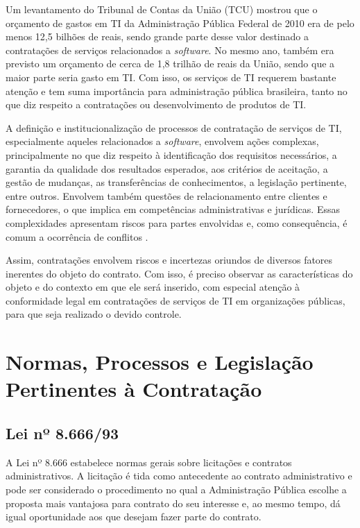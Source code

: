 Um levantamento do Tribunal de Contas da União (TCU) mostrou que o orçamento de gastos em TI da Administração Pública Federal de 2010 era de pelo menos 12,5 bilhões de reais, sendo grande parte desse valor destinado a contratações de serviços relacionados a \textit{software}. No mesmo ano, também era previsto um orçamento de cerca de 1,8 trilhão de reais da União, sendo que a maior parte seria gasto em TI. Com isso, os serviços de TI requerem bastante atenção e tem suma importância para administração pública brasileira, tanto no que diz respeito a contratações ou desenvolvimento de produtos de TI.

A definição e institucionalização de processos de contratação de serviços de TI, especialmente aqueles relacionados a \textit{software}, envolvem ações complexas, principalmente no que diz respeito à identificação dos requisitos necessários, a garantia da qualidade dos resultados esperados, aos critérios de aceitação, a gestão de mudanças, as transferências de conhecimentos, a legislação pertinente, entre outros. Envolvem também questões de relacionamento entre clientes e fornecedores, o que implica em competências administrativas e jurídicas. Essas complexidades apresentam riscos para partes envolvidas e, como consequência, é comum a ocorrência de conflitos \cite{cruz2011}.

Assim, contratações envolvem riscos e incertezas oriundos de diversos fatores inerentes do objeto do contrato. Com isso, é preciso observar as características do objeto e do contexto em que ele será inserido, com especial atenção à conformidade legal em contratações de serviços de TI em organizações públicas, para que seja realizado o devido controle.


\section[Normas, Processos e Legislação Pertinentes à Contratação]{Normas, Processos e Legislação Pertinentes à Contratação}

\subsection[Lei nº 8.666/93]{Lei nº 8.666/93}

A Lei nº 8.666 \cite{Lei8666:1993} estabelece normas gerais sobre licitações e contratos administrativos. A licitação é tida como antecedente ao contrato administrativo e pode ser considerado o procedimento no qual a Administração Pública escolhe a proposta mais vantajosa para contrato do seu interesse e, ao mesmo tempo, dá igual oportunidade aos que desejam fazer parte do contrato.

